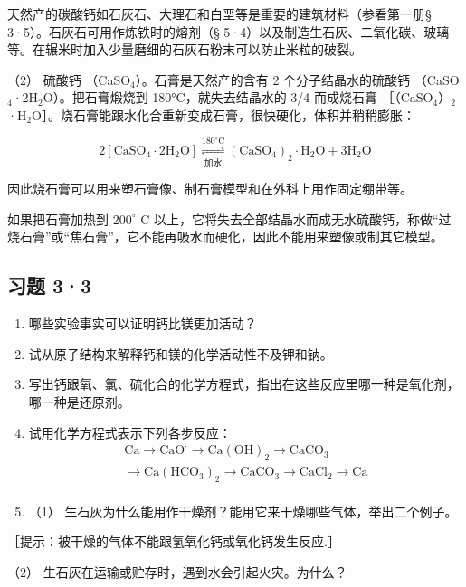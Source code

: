 天然产的碳酸钙如石灰石、大理石和白垩等是重要的建筑材料（参看第一册§
3·5）。石灰石可用作炼铁时的熔剂（§
5·4）以及制造生石灰、二氧化碳、玻璃等。在辗米时加入少量磨细的石灰石粉末可以防止米粒的破裂。

（2） 硫酸钙 （CaSO\(_{4}\)）。石膏是天然产的含有 2 个分子结晶水的硫酸钙
（CaSO\(_{4}\)·2H\(_{2}\)O）。把石膏煅烧到 180°C，就失去结晶水的 3/4
而成烧石膏
［（CaSO\(_{4}\)）\(_{2}\)·H\(_{2}\)O］。烧石膏能跟水化合重新变成石膏，很快硬化，体积并稍稍膨胀：

\[
2\left[\mathrm{CaSO}_{4}\cdot2\mathrm{H}_{2}\mathrm{O}\right]
\mathop{\rightleftharpoons}\limits_{\text{加水}}^{180^{\circ}\mathrm{C}}
(\mathrm{CaSO}_{4})_{2}\cdot\mathrm{H}_{2}\mathrm{O}+3\mathrm{H}_{2}\mathrm{O}
\]

因此烧石膏可以用来塑石膏像、制石膏模型和在外科上用作固定绷带等。

如果把石膏加热到 \(200^{\circ}\) C
以上，它将失去全部结晶水而成无水硫酸钙，称做``过烧石膏''或``焦石膏''，它不能再吸水而硬化，因此不能用来塑像或制其它模型。

\subsection{习题 3·3}

\begin{enumerate}
\item
  哪些实验事实可以证明钙比镁更加活动？
\item
  试从原子结构来解释钙和镁的化学活动性不及钾和钠。
\item
  写出钙跟氧、氯、硫化合的化学方程式，指出在这些反应里哪一种是氧化剂，哪一种是还原剂。
\item
  试用化学方程式表示下列各步反应：
\[
\begin{array}{l} \mathrm{Ca} \longrightarrow \mathrm{CaO} ^ {\cdot} \longrightarrow \mathrm{Ca(OH)} _ {2} \longrightarrow \mathrm{CaCO} _ {3} \\ \longrightarrow \mathrm{Ca} (\mathrm{HCO} _ {3}) _ {2} \longrightarrow \mathrm{CaCO} _ {3} \longrightarrow \mathrm{CaCl} _ {2} \longrightarrow \mathrm{Ca} \\ \end{array}
\]
\item
  （1） 生石灰为什么能用作干燥剂？能用它来干燥哪些气体，举出二个例子。
\end{enumerate}

［提示：被干燥的气体不能跟氢氧化钙或氧化钙发生反应.］

（2） 生石灰在运输或贮存时，遇到水会引起火灾。为什么？


